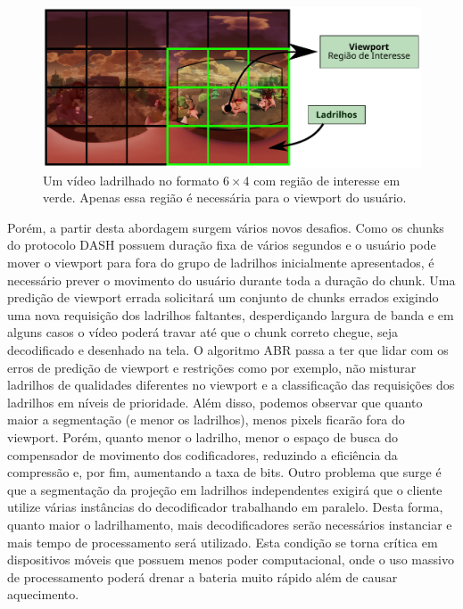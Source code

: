 \begin{figure}[h]
	\centering
	\includegraphics[width=0.80\columnwidth]{fig/viewport2.pdf}
	\caption{Um vídeo ladrilhado no formato $6 \times 4$ com região de interesse em verde. Apenas essa região é necessária para o viewport do usuário.}
	\label{fig:viewport2}
\end{figure}

Porém, a partir desta abordagem surgem vários novos desafios. Como os chunks do protocolo DASH possuem duração fixa de vários segundos e o usuário pode mover o viewport para fora do grupo de ladrilhos inicialmente apresentados, é necessário prever o movimento do usuário durante toda a duração do chunk. Uma predição de viewport errada solicitará um conjunto de chunks errados exigindo uma nova requisição dos ladrilhos faltantes, desperdiçando largura de banda e em alguns casos o vídeo poderá travar até que o chunk correto chegue, seja decodificado e desenhado na tela. O algoritmo ABR passa a ter que lidar com os erros de predição de viewport e restrições como por exemplo, não misturar ladrilhos de qualidades diferentes no viewport e a classificação das requisições dos ladrilhos em níveis de prioridade. Além disso, podemos observar que quanto maior a segmentação (e menor os ladrilhos), menos pixels ficarão fora do viewport. Porém, quanto menor o ladrilho, menor o espaço de busca do compensador de movimento dos codificadores, reduzindo a eficiência da compressão e, por fim, aumentando a taxa de bits. Outro problema que surge é que a segmentação da projeção em ladrilhos independentes exigirá que o cliente utilize várias instâncias do decodificador trabalhando em paralelo. Desta forma, quanto maior o ladrilhamento, mais decodificadores serão necessários instanciar e mais tempo de processamento será utilizado. Esta condição se torna crítica em dispositivos móveis que possuem menos poder computacional, onde o uso massivo de processamento poderá drenar a bateria muito rápido além de causar aquecimento.

